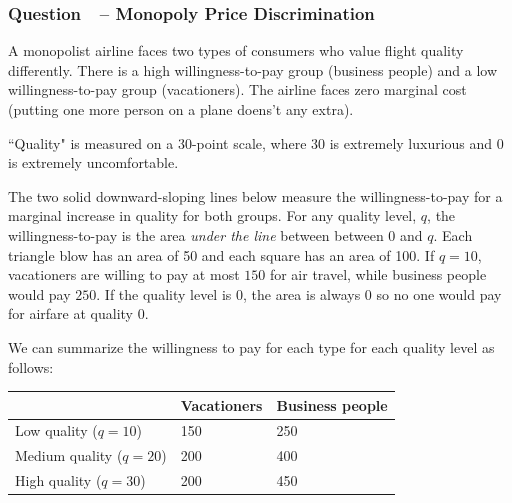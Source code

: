 \documentclass[12pt]{article}
\newcounter{question}[section]
\newcommand{\question}[1]{\refstepcounter{question}
  \subsubsection*{Question~\thequestion~-- #1}}
\begin{document}
\question{Monopoly Price Discrimination}
A monopolist airline faces two types of consumers who value flight quality
differently. There is a high willingness-to-pay group (business people) and a
low willingness-to-pay group (vacationers). The airline faces zero marginal
cost (putting one more person on a plane doens't any extra).

``Quality" is measured on a 30-point scale, where 30 is extremely
luxurious and 0 is extremely uncomfortable.

The two solid downward-sloping lines below measure the willingness-to-pay for a
marginal increase in quality for both groups.  For any quality level, $q$, the
willingness-to-pay is the area \emph{under the line} between between 0 and $q$. Each triangle blow has an area of 50 and each square has an area of 100.
If $q=10$, vacationers are willing to pay at most $150$ for air travel,
while business people would pay $250$.  If the quality level is 0,
the area is always 0 so no one would pay for airfare at quality 0.
\begin{center}
\end{center}
\textcolor{solution-color}{We can summarize the willingness to pay for each type for each quality level as follows:
  \begin{center}
    \begin{tabular}{l|l|l} \hline \hline
      & Vacationers & Business people \\ \hline
      Low quality ($q=10$)  &  150 & 250 \\
      Medium quality ($q=20$) & 200 & 400 \\
      High quality ($q=30$) & 200 & 450 \\ \hline \hline
    \end{tabular}
  \end{center}
}
\end{document}
